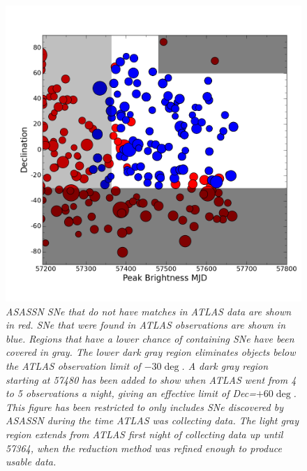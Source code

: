 \begin{figure}[h!]%
\begin{center}
    \includegraphics[width=1\linewidth]{figures/plot2useinPaper_restrictxfurther.png}%
     \caption{\it \small{ASASSN SNe that do not have matches in ATLAS data are shown in red.  SNe that were found in ATLAS observations are shown in blue.  Regions that have a lower chance of containing SNe have been covered in gray.  The lower dark gray region eliminates objects below the ATLAS observation limit of $-30\deg$.  A dark gray region starting at 57480 has been added to show when ATLAS went from 4 to 5 observations a night, giving an effective limit of Dec=$+60\deg$.  This figure has been restricted to only includes SNe discovered by ASASSN during the time ATLAS was collecting data.  The light gray region extends from ATLAS first night of collecting data up until 57364, when the reduction method was refined enough to produce usable data.~\label{fig:dec_mjd}}}
  \end{center}%
\end{figure}

